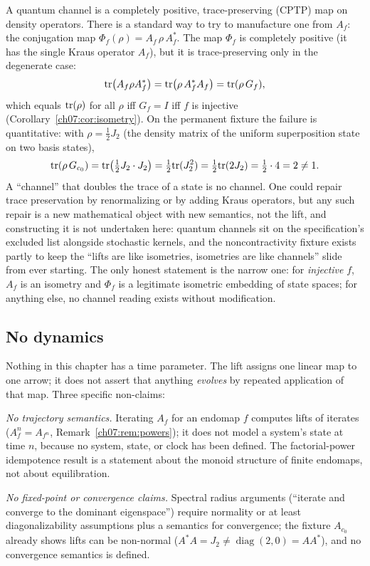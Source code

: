 A quantum channel is a completely positive, trace-preserving (CPTP) map on
density operators. There is a standard way to try to manufacture one from
$A_f$: the conjugation map $\Phi_f(\rho)=A_f\,\rho\,A_f^{*}$. The map
$\Phi_f$ is completely positive (it has the single Kraus operator $A_f$),
but it is trace-preserving only in the degenerate case:
\[
\mathrm{tr}\bigl(A_f\rho A_f^{*}\bigr)=\mathrm{tr}\bigl(\rho\,A_f^{*}A_f\bigr)
=\mathrm{tr}(\rho\,G_f),
\]
which equals $\mathrm{tr}(\rho)$ for all $\rho$ iff $G_f=I$ iff $f$ is injective
(Corollary~\ref{ch07:cor:isometry}). On the permanent fixture the failure is
quantitative: with $\rho=\tfrac12 J_2$ (the density matrix of the uniform
superposition state on two basis states),
\[
\mathrm{tr}(\rho\,G_{c_0})=\mathrm{tr}\bigl(\tfrac12 J_2\cdot J_2\bigr)
=\tfrac12\mathrm{tr}(J_2^2)=\tfrac12\mathrm{tr}(2J_2)=\tfrac12\cdot 4=2\neq 1 .
\]
A ``channel'' that doubles the trace of a state is no channel. One could
repair trace preservation by renormalizing or by adding Kraus operators, but
any such repair is a new mathematical object with new semantics, not the
lift, and constructing it is not undertaken here: quantum channels sit on
the specification's excluded list alongside stochastic kernels, and the
noncontractivity fixture exists partly to keep the ``lifts are like
isometries, isometries are like channels'' slide from ever starting. The
only honest statement is the narrow one: for \emph{injective} $f$, $A_f$ is
an isometry and $\Phi_f$ is a legitimate isometric embedding of state
spaces; for anything else, no channel reading exists without modification.

\subsection{No dynamics}\label{ch07:sec:nodynamics}

Nothing in this chapter has a time parameter. The lift assigns one linear
map to one arrow; it does not assert that anything \emph{evolves} by
repeated application of that map. Three specific non-claims:

\emph{No trajectory semantics.} Iterating $A_f$ for an endomap $f$ computes
lifts of iterates ($A_f^n=A_{f^n}$, Remark~\ref{ch07:rem:powers}); it does
not model a system's state at time $n$, because no system, state, or clock
has been defined. The factorial-power idempotence result is a statement
about the monoid structure of finite endomaps, not about equilibration.

\emph{No fixed-point or convergence claims.} Spectral radius arguments
(``iterate and converge to the dominant eigenspace'') require normality or
at least diagonalizability assumptions plus a semantics for convergence;
the fixture $A_{c_0}$ already shows lifts can be non-normal
($A^*A=J_2\neq \operatorname{diag}(2,0)=AA^{*}$), and no convergence
semantics is defined.

